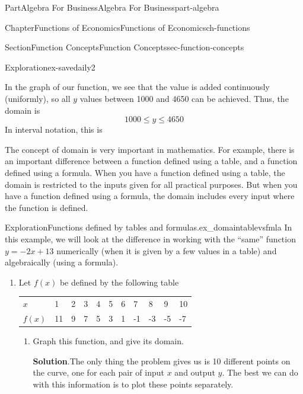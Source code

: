 \documentclass[oneside,10pt,]{tufte-book}
\newcommand{\blocktitlefont}{\relax}
\newcommand{\tabularfont}{\relax}
\numberwithin{equation}{chapter}
\begin{document}
\begin{partptx}{Part}{Algebra For Business}{}{Algebra For Business}{}{}{part-algebra}
\begin{chapterptx}{Chapter}{Functions of Economics}{}{Functions of Economics}{}{}{ch-functions}
\begin{sectionptx}{Section}{Function Concepts}{}{Function Concepts}{}{}{sec-function-concepts}
\begin{exploration}{Exploration}{}{ex-savedaily2}
\begin{enumerate}[font=\bfseries,label=(\alph*),ref=\alph*]
\begin{image}{0}{1}{0}{}
{\begin{tikzpicture}
\end{tikzpicture}
}%
\end{image}%
In the graph of our function, we see that the value is added continuously (uniformly), so all \(y\) values between 1000 and 4650 can be achieved. Thus, the domain is%
\begin{equation*}
1000 \leq y \leq 4650
\end{equation*}
In interval notation, this is%
\begin{equation*}
[1000,4650]
\end{equation*}
%
\end{enumerate}%
\end{exploration}%
The concept of domain is very important in mathematics.  For example, there is an important difference between a function defined using a table, and a function defined using a formula. When you have a function defined using a table, the domain is restricted to the inputs given for all practical purposes. But when you have a function defined using a formula, the domain includes every input where the function is defined.%
\begin{exploration}{Exploration}{Functions defined by tables and formulas.}{ex_domaintablevsfmla}%
In this example, we will look at the difference in working with the ``same'' function \(y = -2x + 13\) numerically (when it is given by a few values in a table) and algebraically (using a formula).%
\begin{enumerate}[font=\bfseries,label=(\alph*),ref=\alph*]%
\item{}Let \(f(x)\) be defined by the following table  \begin{center}%
{\tabularfont%
\begin{tabular}{lllllllllll}
\(x\)&1&2&3&4&5&6&7&8&9&10\tabularnewline[0pt]
\(f(x)\)&11&9&7&5&3&1&-1&-3&-5&-7
\end{tabular}
}%
\end{center}%
%
\begin{enumerate}[font=\bfseries,label=(\roman*),ref=\theenumi.\roman*]%
\item{}Graph this function, and give its domain.%
\par\smallskip%
\noindent\textbf{\blocktitlefont Solution}.\hypertarget{ex_domaintablevsfmla-3-2-2}{}\quad{}The only thing the problem gives us is 10 different points on the curve, one for each pair of input \(x\) and output \(y\).  The best we can do with this information is to plot these points separately.%
\begin{image}{0.25}{0.5}{0.25}{}%

\end{image}
\end{enumerate}
\end{enumerate}
\end{exploration}
\end{sectionptx}
\end{chapterptx}
\end{partptx}
\end{document}
